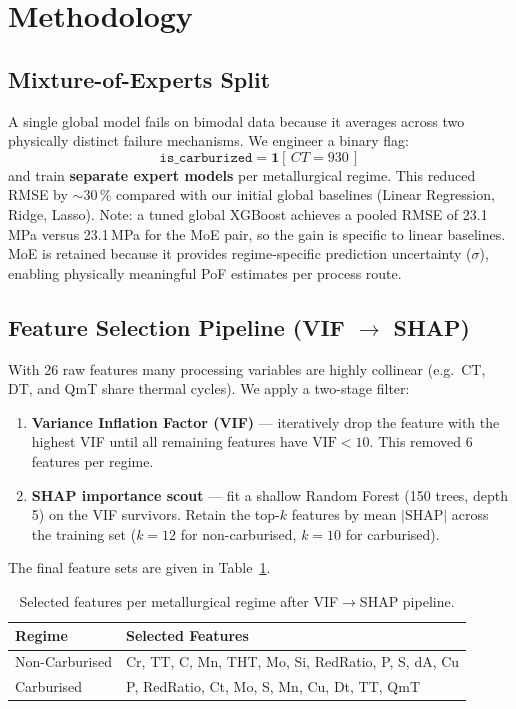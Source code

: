 \documentclass[12pt,a4paper]{article}
\begin{document}
\section{Methodology}

\subsection{Mixture-of-Experts Split}

A single global model fails on bimodal data because it averages across two physically distinct
failure mechanisms. We engineer a binary flag:
\[
  \texttt{is\_carburized} = \mathbf{1}[\,CT = 930\,]
\]
and train \textbf{separate expert models} per metallurgical regime. This reduced RMSE by
$\sim$30\,\% compared with our initial global baselines (Linear Regression, Ridge, Lasso).
Note: a tuned global XGBoost achieves a pooled RMSE of 23.1\,MPa versus 23.1\,MPa for the
MoE pair, so the gain is specific to linear baselines. MoE is retained because it provides
regime-specific prediction uncertainty ($\sigma$), enabling physically meaningful PoF estimates
per process route.

\subsection{Feature Selection Pipeline (VIF $\rightarrow$ SHAP)}

With 26 raw features many processing variables are highly collinear (e.g.\ CT, DT, and QmT share
thermal cycles). We apply a two-stage filter:

\begin{enumerate}[nosep]
  \item \textbf{Variance Inflation Factor (VIF)} — iteratively drop the feature with the highest
        VIF until all remaining features have $\text{VIF} < 10$. This removed 6 features per regime.
  \item \textbf{SHAP importance scout} — fit a shallow Random Forest (150 trees, depth 5) on the
        VIF survivors. Retain the top-$k$ features by mean $|\text{SHAP}|$ across the training set
        ($k=12$ for non-carburised, $k=10$ for carburised).
\end{enumerate}

The final feature sets are given in Table~\ref{tab:features}.

\begin{table}[H]
  \centering
  \caption{Selected features per metallurgical regime after VIF$\to$SHAP pipeline.}
  \label{tab:features}
  \begin{tabular}{ll}
    \toprule
    \textbf{Regime} & \textbf{Selected Features} \\
    \midrule
    Non-Carburised & Cr, TT, C, Mn, THT, Mo, Si, RedRatio, P, S, dA, Cu \\
    Carburised     & P, RedRatio, Ct, Mo, S, Mn, Cu, Dt, TT, QmT \\
    \bottomrule
  \end{tabular}
\end{table}
\end{document}
